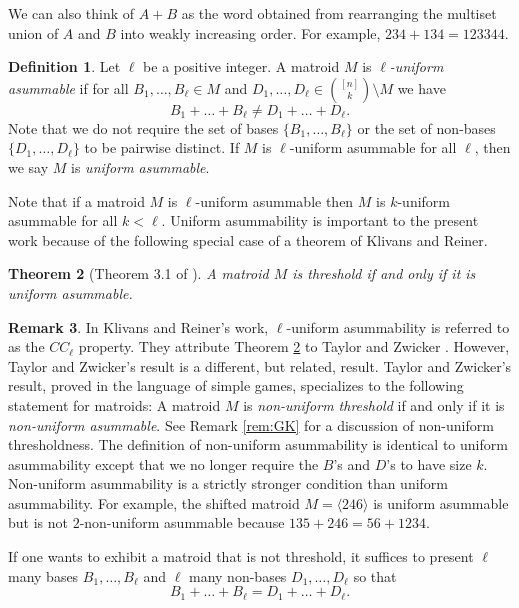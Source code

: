 \documentclass{amsart}
\theoremstyle{definition}
\newtheorem{defn}{Definition}[section]
\newtheorem{remark}[defn]{Remark}
\theoremstyle{plain}
\newtheorem{thrm}[defn]{Theorem}
\begin{document}
We can also think of $A+B$ as the word obtained from rearranging the multiset union of $A$ and $B$ into weakly increasing order. For example, $234+134= 123344$.

\begin{defn}
\label{def:trade_robust}
Let $\ell$ be a positive integer. A matroid $M$ is \emph{$\ell$-uniform asummable} if for all $B_1,\ldots, B_\ell \in M$ and $D_1,\ldots, D_\ell \in \binom{[n]}{k}\setminus M$ we have
\[B_1+\ldots+B_\ell \neq D_1+\ldots +D_\ell. \]
Note that we do not require the set of bases $\{B_1,\ldots, B_\ell\}$ or the set of non-bases $\{D_1,\ldots, D_\ell\}$ to be pairwise distinct. If $M$ is $\ell$-uniform asummable for all $\ell$, then we say $M$ is \emph{uniform asummable}.
\end{defn}


Note that if a matroid $M$ is $\ell$-uniform asummable then $M$ is $k$-uniform asummable for all $k<\ell$. Uniform asummability is important to the present work because of the following special case of a theorem of Klivans and Reiner.

\begin{thrm}[Theorem 3.1 of \cite{KR}]
  \label{thrm:KR}
A matroid $M$ is threshold if and only if it is uniform asummable.
\end{thrm}

\begin{remark}
  In Klivans and Reiner's work, $\ell$-uniform asummability is referred to as the $CC_\ell$ property. They attribute Theorem \ref{thrm:KR} to Taylor and Zwicker \cite[Theorem $2.4.2$]{TZ}. However, Taylor and Zwicker's result is a different, but related, result. Taylor and Zwicker's result, proved in the language of simple games, specializes to the following statement for matroids: A matroid $M$ is \emph{non-uniform threshold} if and only if it is \emph{non-uniform asummable}. See Remark \ref{rem:GK} for a discussion of non-uniform thresholdness. The definition of non-uniform asummability is identical to uniform asummability except that we no longer require the $B$'s and $D$'s to have size $k$. Non-uniform asummability is a strictly stronger condition than uniform asummability. For example, the shifted matroid $M= \langle 246 \rangle$ is uniform asummable but is not $2$-non-uniform asummable because $135 + 246 = 56 + 1234$.
\end{remark}

If one wants to exhibit a matroid that is not threshold, it suffices to present $\ell$ many bases $B_1,\ldots, B_\ell$ and $\ell$ many non-bases $D_1,\ldots, D_\ell$ so that 
\[B_1+\ldots+B_\ell = D_1+\ldots+D_\ell. \]
\end{document}

